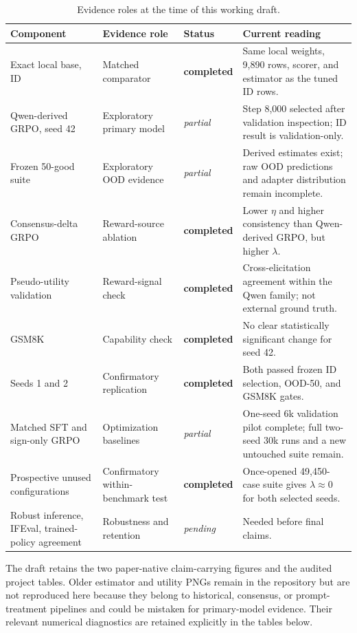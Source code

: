 \documentclass[11pt,letterpaper]{article}
\newcommand{\pending}{\textit{pending}}
\newcommand{\done}{\textbf{completed}}
\newcommand{\partdone}{\textit{partial}}
\begin{document}
\begin{table}[htbp]
\centering
\small
\begin{tabular}{L{0.22\textwidth}L{0.18\textwidth}L{0.18\textwidth}L{0.33\textwidth}}
\toprule
Component & Evidence role & Status & Current reading \\
\midrule
Exact local base, ID & Matched comparator & \done & Same local weights, 9,890 rows, scorer, and estimator as the tuned ID rows. \\
Qwen-derived GRPO, seed 42 & Exploratory primary model & \partdone & Step 8,000 selected after validation inspection; ID result is validation-only. \\
Frozen 50-good suite & Exploratory OOD evidence & \partdone & Derived estimates exist; raw OOD predictions and adapter distribution remain incomplete. \\
Consensus-delta GRPO & Reward-source ablation & \done & Lower $\eta$ and higher consistency than Qwen-derived GRPO, but higher $\lambda$. \\
Pseudo-utility validation & Reward-signal check & \done & Cross-elicitation agreement within the Qwen family; not external ground truth. \\
GSM8K & Capability check & \done & No clear statistically significant change for seed 42. \\
Seeds 1 and 2 & Confirmatory replication & \done & Both passed frozen ID selection, OOD-50, and GSM8K gates. \\
Matched SFT and sign-only GRPO & Optimization baselines & \partdone & One-seed 6k validation pilot complete; full two-seed 30k runs and a new untouched suite remain. \\
Prospective unused configurations & Confirmatory within-benchmark test & \done & Once-opened 49,450-case suite gives $\lambda\approx0$ for both selected seeds. \\
Robust inference, IFEval, trained-policy agreement & Robustness and retention & \pending & Needed before final claims. \\
\bottomrule
\end{tabular}
\caption{Evidence roles at the time of this working draft.}
\label{tab:status}
\end{table}

The draft retains the two paper-native claim-carrying figures and the audited
project tables. Older estimator and utility PNGs remain in the repository but
are not reproduced here because they belong to historical, consensus, or
prompt-treatment pipelines and could be mistaken for primary-model evidence.
Their relevant numerical diagnostics are retained explicitly in the tables
below.
\end{document}
